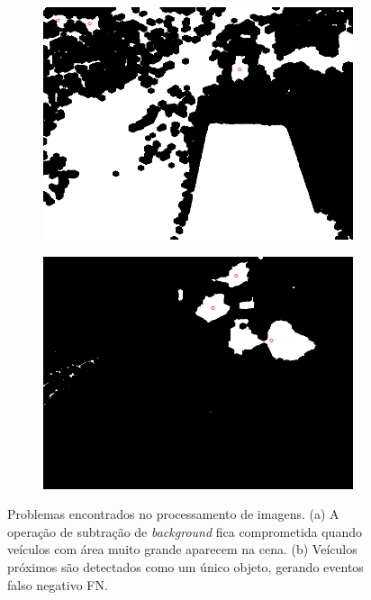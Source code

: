 \begin{figure}[ht]
  \begin{center}
    \begin{subfigure}[b]{.49\textwidth}
      \begin{center}
        \includegraphics[width=1\linewidth]{imgs/problema_veiculo_grande.png}
      \end{center}
      \caption{}
      \label{fig:problema_veiculo_grande}
    \end{subfigure}
    \begin{subfigure}[b]{.49\textwidth}
      \begin{center}
        \includegraphics[width=1\linewidth]{imgs/problema_veiculo_junto.png}
      \end{center}
      \caption{}
      \label{fig:problema_veiculo_junto}
    \end{subfigure}
  \end{center}
  \caption{Problemas encontrados no processamento de imagens. (a) A operação de subtração de \textit{background} fica comprometida quando veículos com área muito grande aparecem na cena. (b) Veículos próximos são detectados como um único objeto, gerando eventos falso negativo FN.}
  \label{fig:problemas}
\end{figure}

